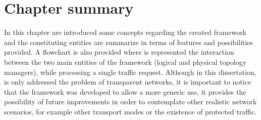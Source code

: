 

\section{Chapter summary}

In this chapter are introduced some concepts regarding the created framework and the constituting entities are summarize in terms of features and possibilities provided. A flowchart is also provided where is represented the interaction between the two main entities of the framework (logical and physical topology managers), while processing a single traffic request. Although in this dissertation, is only addressed the problem of transparent networks, it is important to notice that the framework was developed to allow a more generic use, it provides the possibility of future improvements in order to contemplate other realistic network scenarios, for example other transport modes or the existence of protected traffic.

\cleardoublepage